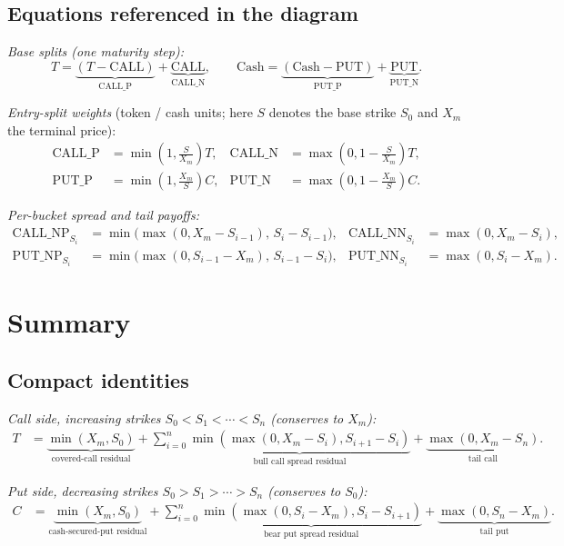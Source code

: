 \documentclass[11pt]{article}
\newcommand{\Call}{\mathrm{CALL}}
\newcommand{\Put}{\mathrm{PUT}}
\newcommand{\CN}{\mathrm{CALL\_N}}
\newcommand{\CP}{\mathrm{CALL\_P}}
\newcommand{\PN}{\mathrm{PUT\_N}}
\newcommand{\PP}{\mathrm{PUT\_P}}
\newcommand{\CNPi}[1]{\mathrm{CALL\_NP}_{#1}}
\newcommand{\CNNi}[1]{\mathrm{CALL\_NN}_{#1}}
\newcommand{\PNPi}[1]{\mathrm{PUT\_NP}_{#1}}
\newcommand{\PNNi}[1]{\mathrm{PUT\_NN}_{#1}}
\begin{document}
\subsection*{Equations referenced in the diagram}

\textit{Base splits (one maturity step):}
\[
T = \underbrace{(T-\Call)}_{\CP} + \underbrace{\Call}_{\CN},
\qquad
\mathrm{Cash} = \underbrace{(\mathrm{Cash}-\Put)}_{\PP} + \underbrace{\Put}_{\PN}.
\]

\textit{Entry-split weights} (token / cash units; here $S$ denotes the base strike $S_0$ and $X_m$ the terminal price):
\begin{align*}
\CP &= \min\!\left(1,\tfrac{S}{X_m}\right)T, & \CN &= \max\!\left(0,1-\tfrac{S}{X_m}\right)T,\\
\PP &= \min\!\left(1,\tfrac{X_m}{S}\right)C, & \PN &= \max\!\left(0,1-\tfrac{X_m}{S}\right)C.
\end{align*}

\textit{Per-bucket spread and tail payoffs:}
\begin{align*}
\CNPi{S_i} &= \min\!\big(\max(0,X_m-S_{i-1}),\,S_i-S_{i-1}\big), & \CNNi{S_i} &= \max(0,X_m-S_i),\\
\PNPi{S_i} &= \min\!\big(\max(0,S_{i-1}-X_m),\,S_{i-1}-S_i\big), & \PNNi{S_i} &= \max(0,S_i-X_m).
\end{align*}

\section{Summary}

\subsection*{Compact identities}

\textit{Call side, increasing strikes $S_0<S_1<\cdots<S_n$ (conserves to $X_m$):}
\begin{align}
T
&= \underbrace{\min(X_m,S_0)}_{\text{covered-call residual}}
+ \sum_{i=0}^{n}\underbrace{\min\!\left(\max(0,X_m-S_{i}),S_{i+1}-S_{i}\right)}_{\text{bull call spread residual}}
+ \underbrace{\max(0,X_m-S_n)}_{\text{tail call}}.
\end{align}

\textit{Put side, decreasing strikes $S_0>S_1>\cdots>S_n$ (conserves to $S_0$):}
\begin{align}
C
&= \underbrace{\min(X_m,S_0)}_{\text{cash-secured-put residual}}
+ \sum_{i=0}^{n}\underbrace{\min\!\left(\max(0,S_{i}-X_m),S_{i}-S_{i+1}\right)}_{\text{bear put spread residual}}
+ \underbrace{\max(0,S_n-X_m)}_{\text{tail put}}.
\end{align}
\end{document}
